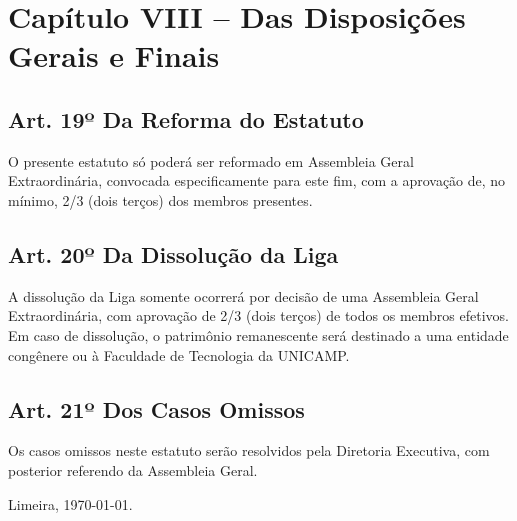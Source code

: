 \documentclass[12pt, a4paper]{article}
\begin{document}
\section{Capítulo VIII – Das Disposições Gerais e Finais}


\subsection{Art. 19º Da Reforma do Estatuto}
O presente estatuto só poderá ser reformado em Assembleia Geral Extraordinária, convocada especificamente para este fim, com a aprovação de, no mínimo, 2/3 (dois terços) dos membros presentes.

\subsection{Art. 20º Da Dissolução da Liga}
A dissolução da Liga somente ocorrerá por decisão de uma Assembleia Geral Extraordinária, com aprovação de 2/3 (dois terços) de todos os membros efetivos. Em caso de dissolução, o patrimônio remanescente será destinado a uma entidade congênere ou à Faculdade de Tecnologia da UNICAMP.

\subsection{Art. 21º Dos Casos Omissos}
Os casos omissos neste estatuto serão resolvidos pela Diretoria Executiva, com posterior referendo da Assembleia Geral.

\bigskip
\bigskip
\begin{center}
    Limeira, \today.
\end{center}
\end{document}
